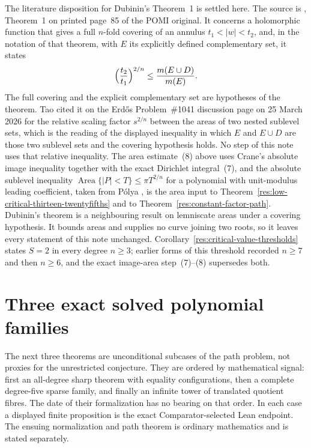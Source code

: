 The literature disposition for Dubinin's Theorem~1 is settled here.  The
source is \cite{dubinin}, Theorem~1 on printed page~85 of the POMI original.
It concerns a holomorphic function that gives a full $n$-fold covering of an
annulus $t_1<|w|<t_2$, and, in the notation of that theorem, with $E$ its
explicitly defined complementary set, it states
\[
 \Bigl(\frac{t_2}{t_1}\Bigr)^{2/n}\le\frac{m(E\cup D)}{m(E)}.
\]
The full covering and the explicit complementary set are hypotheses of the
theorem.  Tao cited it on the Erd\H{o}s Problem~\#1041 discussion page on
25 March 2026 for the relative scaling factor $s^{2/n}$ between the areas of
two nested sublevel sets, which is the reading of the displayed inequality in
which $E$ and $E\cup D$ are those two sublevel sets and the covering
hypothesis holds.  No step of this note uses that relative inequality.  The
area estimate~(8) above uses Crane's absolute image inequality together with
the exact Dirichlet integral~(7), and the absolute sublevel inequality
$\operatorname{Area}\{|P|<T\}\le\pi T^{2/n}$ for a polynomial with
unit-modulus leading coefficient, taken from P\'olya
\cite[printed pp.~280--282]{polya1928}, is the area input to
Theorem~\ref{res:low-critical-thirteen-twentyfifths} and to
Theorem~\ref{res:constant-factor-path}.  Dubinin's theorem is a
neighbouring result on lemniscate areas under a covering hypothesis.  It
bounds areas and supplies no curve joining two roots, so it leaves every
statement of this note unchanged.  Corollary~\ref{res:critical-value-thresholds}
states $S=2$ in every degree $n\ge3$; earlier forms of this threshold recorded
$n\ge7$ and then $n\ge6$, and the exact image-area step~(7)--(8) supersedes
both.

\section{Three exact solved polynomial families}
\label{sec:solved-polynomial-families}

The next three theorems are unconditional subcases of the path problem, not
proxies for the unrestricted conjecture.  They are ordered by mathematical
signal: first an all-degree sharp theorem with equality configurations, then a
complete degree-five sparse family, and finally an infinite tower of translated
quotient fibres.  The date of their formalization has no bearing on that order.
In each case a displayed finite proposition is the exact Comparator-selected
Lean endpoint.  The ensuing normalization and path theorem is ordinary
mathematics and is stated separately.

